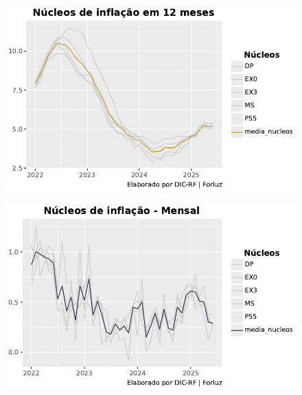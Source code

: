 \documentclass[
  letterpaper,
  DIV=11,
  numbers=noendperiod]{scrartcl}
\begin{document}
\begin{figure}

{\centering \includegraphics{Projeto IPCA Conjuntura_files/figure-pdf/cell-10-output-1.pdf}

}

\end{figure}

\begin{figure}

{\centering \includegraphics{Projeto IPCA Conjuntura_files/figure-pdf/cell-11-output-1.pdf}

}

\end{figure}
\end{document}
